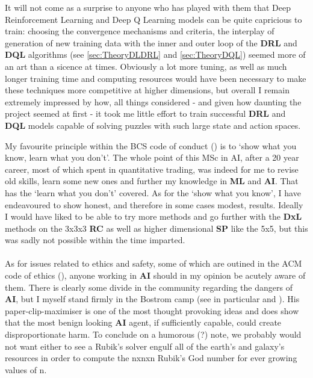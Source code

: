 It will not come as a surprise to anyone who has played with them that Deep Reinforcement Learning and Deep Q Learning models can be quite capricious to train: choosing the convergence mechanisms and criteria, the interplay of generation of new training data with the inner and outer loop of the \textbf{DRL} and \textbf{DQL} algorithms (see \ref{sec:TheoryDLDRL} and \ref{sec:TheoryDQL}) seemed more of an art than a sicence at times. Obviously a lot more tuning, as well as much longer training time and computing resources would have been necessary to make these techniques more competitive at higher dimensions, but overall I remain extremely impressed by how, all things considered - and given how daunting the project seemed at first - it took me little effort to train successful \textbf{DRL} and \textbf{DQL} models capable of solving puzzles with such large state and action spaces.

My favourite principle within the BCS code of conduct (\cite{BCS}) is to `show what you know, learn what you don't'. The whole point of this MSc in AI, after a 20 year career, most of which spent in quantitative trading, was indeed for me to revise old skills, learn some new ones and further my knowledge in \textbf{ML} and \textbf{AI}. That has the `learn what you don't' covered. As for the `show what you know', I have endeavoured to show honest, and therefore in some cases modest, results. Ideally I would have liked to be able to try more methods and go further with the \textbf{DxL} methods on the 3x3x3 \textbf{RC} as well as higher dimensional \textbf{SP} like the 5x5, but this was sadly not possible within the time imparted.
\\
\\
As for issues related to ethics and safety, some of which are outined in the ACM code of ethics (\cite{ACM}), anyone working in \textbf{AI} should in my opinion be acutely aware of them. There is clearly some divide in the community regarding the dangers of \textbf{AI}, but I myself stand firmly in the Bostrom camp (see in particular \cite{https://doi.org/10.1111/1758-5899.12718} and \cite{Bostrom2014}). His paper-clip-maximiser is one of the most thought provoking ideas and does show that the most benign looking \textbf{AI} agent, if sufficiently capable, could create disproportionate harm. To conclude on a humorous (?) note, we probably would not want either to see a Rubik's solver engulf all of the earth's and galaxy's resources in order to compute the nxnxn Rubik's God number for ever growing values of n.
